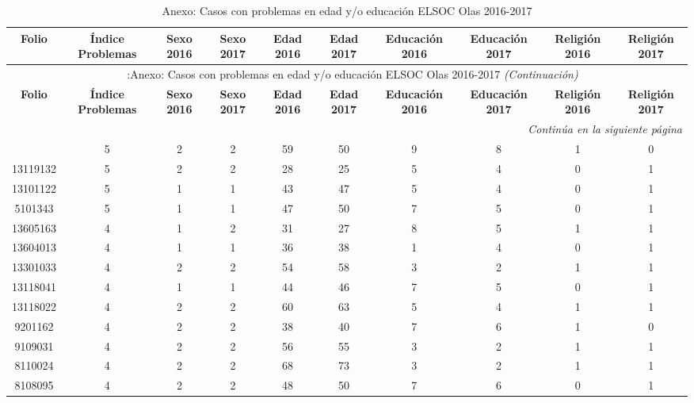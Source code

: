 \newpage
\begin{landscape}
	\begin{center}
		\begin{scriptsize}
			\begin{longtable}{cccccccccc}
				\caption{Anexo: Casos con problemas en edad y/o educación ELSOC Olas 2016-2017}\\
				\toprule
				\textbf{Folio} & \textbf{Índice Problemas} &\textbf{Sexo 2016} & \textbf{Sexo 2017} &\textbf{Edad 2016} &\textbf{Edad 2017} & \textbf{Educación 2016} &\textbf{Educación 2017} &\textbf{Religión 2016} & \textbf{Religión 2017}\\
				\midrule
				\midrule
				\endfirsthead
				\multicolumn{10}{c}{\tablename\ \thetable\ :Anexo: Casos con problemas en edad y/o educación ELSOC Olas 2016-2017
					\textit{(Continuación)}} \\
				\toprule
				\textbf{Folio} & \textbf{Índice Problemas} &\textbf{Sexo 2016} & \textbf{Sexo 2017} &\textbf{Edad 2016} &\textbf{Edad 2017} & \textbf{Educación 2016} &\textbf{Educación 2017} &\textbf{Religión 2016} & \textbf{Religión 2017}\\
				\midrule		
				\endhead
				\hline \multicolumn{10}{r}{\textit{Continúa en la siguiente página}} \\
				\endfoot
				\hline
				\endlastfoot
				\hline
				13201012 & 5 & 2 & 2 & 59 & 50 & 9 & 8 & 1 & 0 \\ 
				13119132 & 5 & 2 & 2 & 28 & 25 & 5 & 4 & 0 & 1 \\ 
				13101122 & 5 & 1 & 1 & 43 & 47 & 5 & 4 & 0 & 1 \\ 
				5101343 & 5 & 1 & 1 & 47 & 50 & 7 & 5 & 0 & 1 \\ 
				13605163 & 4 & 1 & 2 & 31 & 27 & 8 & 5 & 1 & 1 \\ 
				13604013 & 4 & 1 & 1 & 36 & 38 & 1 & 4 & 0 & 1 \\ 
				13301033 & 4 & 2 & 2 & 54 & 58 & 3 & 2 & 1 & 1 \\ 
				13118041 & 4 & 1 & 1 & 44 & 46 & 7 & 5 & 0 & 1 \\ 
				13118022 & 4 & 2 & 2 & 60 & 63 & 5 & 4 & 1 & 1 \\ 
				9201162 & 4 & 2 & 2 & 38 & 40 & 7 & 6 & 1 & 0 \\ 
				9109031 & 4 & 2 & 2 & 56 & 55 & 3 & 2 & 1 & 1 \\ 
				8110024 & 4 & 2 & 2 & 68 & 73 & 3 & 2 & 1 & 1 \\ 
				8108095 & 4 & 2 & 2 & 48 & 50 & 7 & 6 & 0 & 1 \\ 

\end{longtable}
\end{scriptsize}
\end{center}
\end{landscape}
